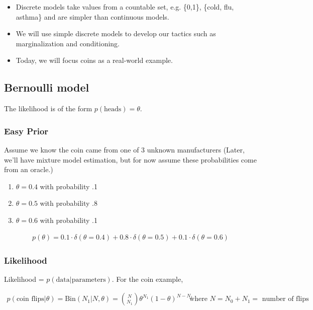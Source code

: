 \documentclass{article}
\begin{document}

\begin{itemize}
\item Discrete models take values from a countable set, e.g. \{0,1\}, \{cold, flu, asthma\} and are simpler than continuous models.
\item We will use simple discrete models to develop our tactics such as marginalization and conditioning. 
\item Today, we will focus coins as a real-world example.
\end{itemize}

\subsection{Bernoulli model}
The likelihood is of the form $p(\text{heads}) = \theta$.

\subsubsection*{Easy Prior}
Assume we know the coin came from one of 3 unknown manufacturers (Later, we'll have mixture model estimation, but for now assume these probabilities come from an oracle.)\\

\begin{enumerate}
\item $\theta = 0.4$ with probability .1 \\
\item $\theta = 0.5$ with probability .8 \\
\item $\theta = 0.6$ with probability .1 \\
\end{enumerate}

\begin{align*}
p(\theta) = 0.1 \cdot \delta(\theta = 0.4)  + 0.8 \cdot \delta(\theta = 0.5) + 0.1 \cdot \delta(\theta = 0.6)
\end{align*}

\subsubsection*{Likelihood}
Likelihood = $p(\text{data}|\text{parameters})$. For the coin example, 

\begin{align*}
p(\text{coin flips}|\theta) = \textrm{Bin}(N_1 | N, \theta) = {N \choose N_1} \theta^{N_1} (1-\theta)^{N-N_1} && \text{where $N = N_0 + N_1 =$ number of flips} \\
\end{align*}
\end{document}
